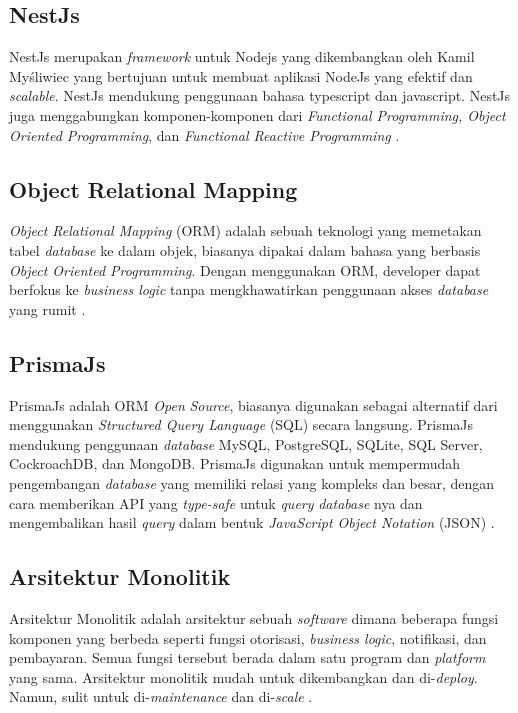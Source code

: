 \subsection{NestJs}
NestJs merupakan \textit{framework} untuk Nodejs yang dikembangkan oleh Kamil Myśliwiec yang bertujuan untuk membuat aplikasi NodeJs yang efektif dan \textit{scalable}. NestJs mendukung penggunaan bahasa typescript dan javascript. NestJs juga menggabungkan komponen-komponen dari \textit{Functional Programming, Object Oriented Programming}, dan \textit{Functional Reactive Programming} \cite{pham2020developing} \cite{NestJS}.

\subsection{Object Relational Mapping}
\textit{Object Relational Mapping} (ORM) adalah sebuah teknologi yang memetakan tabel \textit{database} ke dalam objek, biasanya dipakai dalam bahasa yang berbasis \textit{Object Oriented Programming}. Dengan menggunakan ORM, developer dapat berfokus ke \textit{business logic} tanpa mengkhawatirkan penggunaan akses \textit{database} yang rumit \cite{lorenz2017object}. 

\subsection{PrismaJs}
PrismaJs adalah ORM \textit{Open} \textit{Source}, biasanya digunakan sebagai alternatif dari menggunakan \textit{Structured Query Language} (SQL) secara langsung. PrismaJs mendukung penggunaan \textit{database} MySQL, PostgreSQL, SQLite, SQL Server, CockroachDB, dan MongoDB. PrismaJs digunakan untuk mempermudah pengembangan \textit{database} yang memiliki relasi yang kompleks dan besar, dengan cara memberikan API yang \textit{type-safe} untuk \textit{query} \textit{database} nya dan mengembalikan hasil \textit{query} dalam bentuk \textit{JavaScript Object Notation} (JSON) \cite{Prisma}.

\subsection{Arsitektur Monolitik}
Arsitektur Monolitik adalah arsitektur sebuah \textit{software} dimana beberapa fungsi komponen yang berbeda seperti fungsi otorisasi, \textit{business logic}, notifikasi, dan pembayaran. Semua fungsi tersebut berada dalam satu program dan \textit{platform} yang sama. Arsitektur monolitik mudah untuk dikembangkan dan di-\textit{deploy}. Namun, sulit untuk di-\textit{maintenance} dan di-\textit{scale} \cite{gos2020comparison}. 


